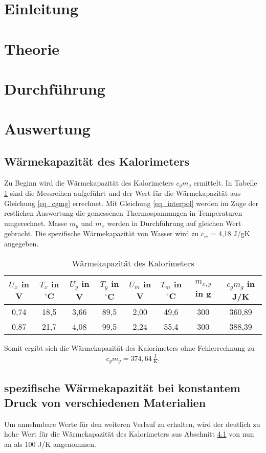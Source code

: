 \section{Einleitung}				%

\section{Theorie}

\section{Durchführung}

\section{Auswertung}
\subsection{Wärmekapazität des Kalorimeters}
\label{sec_kalorimeter}
Zu Beginn wird die Wärmekapazität des Kalorimeters $c_g m_g$ ermittelt. In Tabelle \ref{tab_cgmg} sind die Messreihen aufgeführt und der
Wert für die Wärmekapazität aus Gleichung \eqref{eq_cgmg} errechnet. Mit Gleichung \eqref{eq_interpol} werden im Zuge der restlichen 
Auswertung die gemessenen Thermospannungen in Temperaturen umgerechnet. Masse $m_y$ und $m_x$ werden in Durchführung auf gleichen Wert
gebracht. Die spezifische Wärmekapazität von Wasser wird zu $c_w$ = 4,18 J/gK angegeben.
\begin{table}[H]
 \begin{tabular}{c|c|c|c|c|c|c|c}
 $U_x$ in V & $T_x$ in $^\circ$C & $U_y$ in V & $T_y$ in $^\circ$C & $U_m$ in V & $T_m$ in $^\circ$C & $m_{x,y}$ in g & $c_g m_g$ in J/K\\
 \hline
0,74&	18,5&	3,66&	89,5&	2,00&	49,6&	300&	360,89\\
0,87&	21,7&	4,08&	99,5&	2,24&	55,4&	300&	388,39\\
 \end{tabular}
\caption{Wärmekapazität des Kalorimeters}
\label{tab_cgmg}
\end{table}
Somit ergibt sich die Wärmekapazität des Kalorimeters ohne Fehlerrechnung zu 
\begin{align}
c_g m_g = 374,64 \, \frac{\text{J}}{\text{K}}.
\end{align}

\subsection[spezifische Wärmekapazität verschiedener Materialien]{spezifische Wärmekapazität bei konstantem Druck von verschiedenen Materialien}
Um annehmbare Werte für den weiteren Verlauf zu erhalten, wird der deutlich zu hohe Wert für die Wärmekapazität des Kalorimeters aus Abschnitt
\ref{sec_kalorimeter} von nun an als 100 J/K angenommen. 

